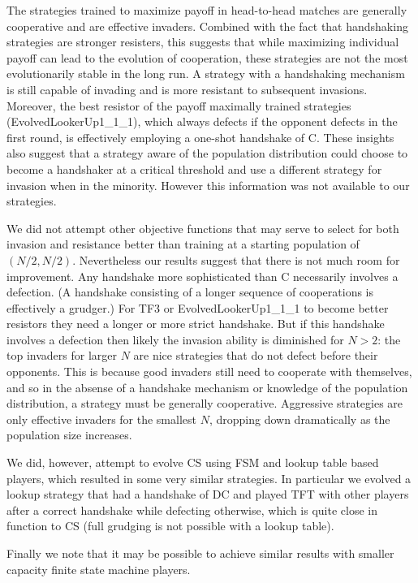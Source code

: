 \documentclass{article}
\begin{document}
The strategies trained to maximize payoff in head-to-head matches are generally
cooperative and are effective invaders.
Combined with the fact that handshaking strategies are stronger resisters,
this suggests that while maximizing individual payoff can lead to the evolution
of cooperation, these strategies are not the most evolutionarily stable
in the long run. A strategy with a handshaking mechanism is still capable of
invading and is more resistant to subsequent invasions. Moreover, the
best resistor of the payoff maximally trained strategies (EvolvedLookerUp1_1_1),
which always defects if the opponent defects in the first round, is effectively
employing a one-shot handshake of C. These insights also suggest that a strategy
aware of the population distribution could choose to become a handshaker at
a critical threshold and use a different strategy for invasion when in the
minority. However this information was not available to our strategies.

We did not attempt other objective functions that may serve to select for both
invasion and resistance better than training at a starting population of
$(N/2, N/2)$. Nevertheless our results suggest that there is not much room for
improvement. Any handshake more sophisticated than C necessarily involves
a defection. (A handshake consisting of a longer sequence of cooperations is
effectively a grudger.) For TF3 or EvolvedLookerUp1_1_1 to become better resistors
they need a longer or more strict handshake. But if this handshake involves
a defection then likely the invasion ability is diminished for $N > 2$: the top
invaders for larger $N$ are nice strategies that do not defect before their
opponents. This is because good invaders still need to cooperate with themselves,
and so in the absense of a handshake mechanism or knowledge of the population
distribution, a strategy must be generally cooperative. Aggressive strategies
are only effective invaders for the smallest $N$, dropping down dramatically
as the population size increases.

We did, however, attempt to evolve CS using FSM and lookup table based players,
which resulted in some very similar strategies. In particular we evolved a
lookup strategy that had a handshake of DC and played TFT with other players
after a correct handshake while defecting otherwise, which is quite close in
function to CS (full grudging is not possible with a lookup table).

Finally we note that it may be possible to achieve similar results with smaller
capacity finite state machine players.
\end{document}
